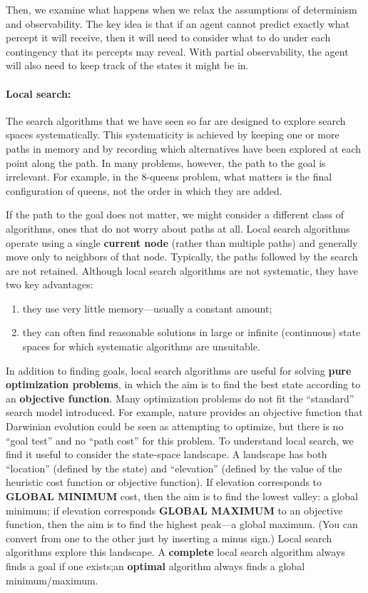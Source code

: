 Then, we examine what happens when we relax the assumptions of determinism and observability. The key idea is that if an agent cannot predict exactly what percept it will receive, then it will need to consider what to do under each contingency that its percepts may reveal. With partial observability, the agent will also need to keep track of the states it might be in.
\paragraph{Local search:}
The search algorithms that we have seen so far are designed to explore search spaces systematically.
This systematicity is achieved by keeping one or more paths in memory and by recording which alternatives have been explored at each point along the path.
In many problems, however, the path to the goal is irrelevant. For example, in the 8-queens problem, what matters is the final configuration of queens, not the order in which they are added. 

If the path to the goal does not matter, we might consider a different class of algorithms, ones that do not worry about paths at all. Local search algorithms operate using a single \textbf{current node} (rather than multiple paths) and generally move only to neighbors of that node. Typically, the paths followed by the search are not retained.
Although local search algorithms are not systematic, they have two key advantages: 
\begin{enumerate}
    \item they use very little memory—usually a constant amount;
    \item they can often find reasonable solutions in large or infinite (continuous) state spaces for which systematic algorithms are unsuitable.
\end{enumerate}
In addition to finding goals, local search algorithms are useful for solving \textbf{pure optimization problems}, in which the aim is to find the best state according to an \textbf{objective function}. Many optimization problems do not fit the “standard” search model introduced. 
For example, nature provides an objective function that Darwinian evolution could be seen as attempting to optimize, but there is no “goal test” and no “path cost” for this problem.
To understand local search, we find it useful to consider the state-space landscape. A landscape has both “location” (defined by the state) and “elevation” (defined by the value of the heuristic cost function or objective function). If elevation corresponds to \textbf{GLOBAL MINIMUM} cost, then the aim is to find the lowest valley: a global minimum; if elevation corresponds \textbf{GLOBAL MAXIMUM} to an objective function, then the aim is to find the highest peak—a global maximum. (You can convert from one to the other just by inserting a minus sign.) Local search algorithms explore this landscape. A \textbf{complete} local search algorithm always finds a goal if one exists;an \textbf{optimal} algorithm always finds a global minimum/maximum.

